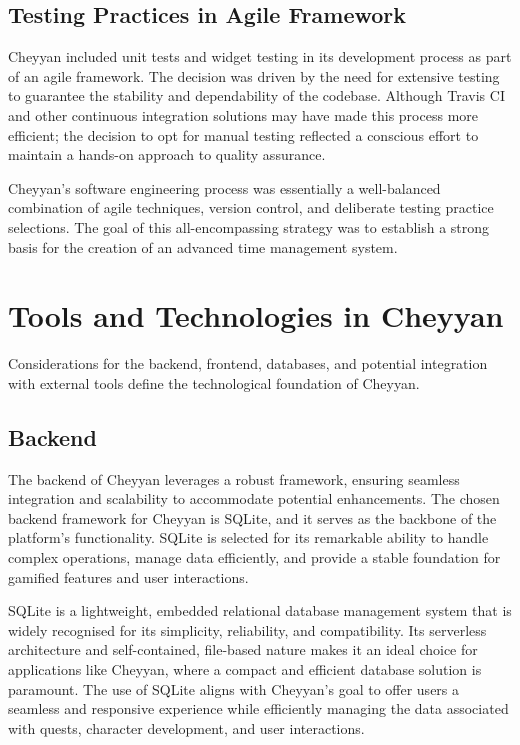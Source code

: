 \documentclass{l4proj}
\begin{document}
\subsection{Testing Practices in Agile Framework}
Cheyyan included unit tests and widget testing in its development process as part of an agile framework. The decision was driven by the need for extensive testing to guarantee the stability and dependability of the codebase. Although Travis CI and other continuous integration solutions may have made this process more efficient; the decision to opt for manual testing reflected a conscious effort to maintain a hands-on approach to quality assurance.

Cheyyan’s software engineering process was essentially a well-balanced combination of agile techniques, version control, and deliberate testing practice selections. The goal of this all-encompassing strategy was to establish a strong basis for the creation of an advanced time management system.

\section{Tools and Technologies in Cheyyan}
Considerations for the backend, frontend, databases, and potential integration with external tools define the technological foundation of Cheyyan.

\subsection{Backend}
The backend of Cheyyan leverages a robust framework, ensuring seamless integration and scalability to accommodate potential enhancements. The chosen backend framework for Cheyyan is SQLite, and it serves as the backbone of the platform’s functionality. SQLite is selected for its remarkable ability to handle complex operations, manage data efficiently, and provide a stable foundation for gamified features and user interactions. 

SQLite is a lightweight, embedded relational database management system that is widely recognised for its simplicity, reliability, and compatibility. Its serverless architecture and self-contained, file-based nature makes it an ideal choice for applications like Cheyyan, where a compact and efficient database solution is paramount. The use of SQLite aligns with Cheyyan’s goal to offer users a seamless and responsive experience while efficiently managing the data associated with quests, character development, and user interactions. 
\end{document}
